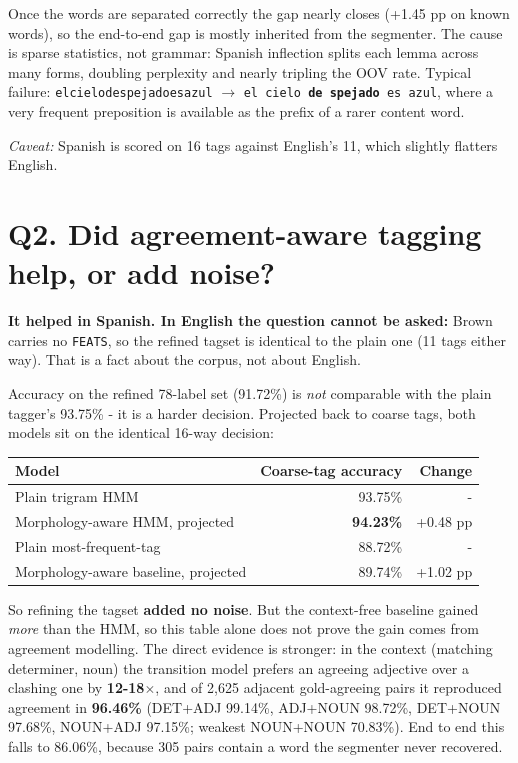 \documentclass[11pt,a4paper]{article}
\begin{document}
\noindent Once the words are separated correctly the gap nearly closes
(+1.45 pp on known words), so the end-to-end gap is mostly inherited from the
segmenter. The cause is sparse statistics, not grammar: Spanish inflection
splits each lemma across many forms, doubling perplexity and nearly tripling the
OOV rate. Typical failure: \texttt{elcielodespejadoesazul} $\rightarrow$
\texttt{el cielo \textbf{de} \textbf{spejado} es azul}, where a very frequent
preposition is available as the prefix of a rarer content word.

\medskip\noindent\emph{Caveat:} Spanish is scored on 16 tags against English's
11, which slightly flatters English.

\section*{Q2. Did agreement-aware tagging help, or add noise?}

\textbf{It helped in Spanish. In English the question cannot be asked:} Brown
carries no \texttt{FEATS}, so the refined tagset is identical to the plain one
(11 tags either way). That is a fact about the corpus, not about English.

\medskip\noindent Accuracy on the refined 78-label set (91.72\%) is \emph{not}
comparable with the plain tagger's 93.75\% - it is a harder decision. Projected
back to coarse tags, both models sit on the identical 16-way decision:

\begin{center}
\begin{tabular}{lrr}
\toprule
Model & Coarse-tag accuracy & Change \\
\midrule
Plain trigram HMM & 93.75\% & - \\
Morphology-aware HMM, projected & \textbf{94.23\%} & +0.48 pp \\
Plain most-frequent-tag & 88.72\% & - \\
Morphology-aware baseline, projected & 89.74\% & +1.02 pp \\
\bottomrule
\end{tabular}
\end{center}

\noindent So refining the tagset \textbf{added no noise}. But the context-free
baseline gained \emph{more} than the HMM, so this table alone does not prove the
gain comes from agreement modelling. The direct evidence is stronger: in the
context (matching determiner, noun) the transition model prefers an agreeing
adjective over a clashing one by \textbf{12-18$\times$}, and of 2{,}625 adjacent
gold-agreeing pairs it reproduced agreement in \textbf{96.46\%} (DET+ADJ 99.14\%,
ADJ+NOUN 98.72\%, DET+NOUN 97.68\%, NOUN+ADJ 97.15\%; weakest NOUN+NOUN 70.83\%).
End to end this falls to 86.06\%, because 305 pairs contain a word the segmenter
never recovered.
\end{document}
